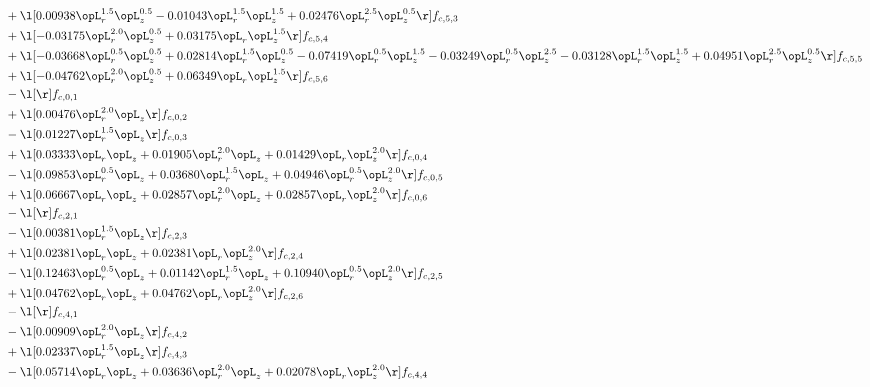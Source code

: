 \begin{alignat}{2}
& + \l[  0.00938 \opL_r^{1.5} \opL_z^{0.5}   -0.01043 \opL_r^{1.5} \opL_z^{1.5} +  0.02476 \opL_r^{2.5} \opL_z^{0.5}  \r] f_{c,5,3} \nonumber \\ 
& + \l[  -0.03175 \opL_r^{2.0} \opL_z^{0.5} +  0.03175 \opL_r \opL_z^{1.5}  \r] f_{c,5,4} \nonumber \\ 
& + \l[  -0.03668 \opL_r^{0.5} \opL_z^{0.5} +  0.02814 \opL_r^{1.5} \opL_z^{0.5}   -0.07419 \opL_r^{0.5} \opL_z^{1.5}   -0.03249 \opL_r^{0.5} \opL_z^{2.5}   -0.03128 \opL_r^{1.5} \opL_z^{1.5} +  0.04951 \opL_r^{2.5} \opL_z^{0.5}  \r] f_{c,5,5} \nonumber \\ 
& + \l[  -0.04762 \opL_r^{2.0} \opL_z^{0.5} +  0.06349 \opL_r \opL_z^{1.5}  \r] f_{c,5,6} \nonumber \\ 
& - \l[  \r] f_{c,0,1} \nonumber \\ 
& + \l[  0.00476 \opL_r^{2.0} \opL_z  \r] f_{c,0,2} \nonumber \\ 
& - \l[  0.01227 \opL_r^{1.5} \opL_z  \r] f_{c,0,3} \nonumber \\ 
& + \l[  0.03333 \opL_r \opL_z +  0.01905 \opL_r^{2.0} \opL_z +  0.01429 \opL_r \opL_z^{2.0}  \r] f_{c,0,4} \nonumber \\ 
& - \l[  0.09853 \opL_r^{0.5} \opL_z +  0.03680 \opL_r^{1.5} \opL_z +  0.04946 \opL_r^{0.5} \opL_z^{2.0}  \r] f_{c,0,5} \nonumber \\ 
& + \l[  0.06667 \opL_r \opL_z +  0.02857 \opL_r^{2.0} \opL_z +  0.02857 \opL_r \opL_z^{2.0}  \r] f_{c,0,6} \nonumber \\ 
& - \l[  \r] f_{c,2,1} \nonumber \\ 
& - \l[  0.00381 \opL_r^{1.5} \opL_z  \r] f_{c,2,3} \nonumber \\ 
& + \l[  0.02381 \opL_r \opL_z +  0.02381 \opL_r \opL_z^{2.0}  \r] f_{c,2,4} \nonumber \\ 
& - \l[  0.12463 \opL_r^{0.5} \opL_z +  0.01142 \opL_r^{1.5} \opL_z +  0.10940 \opL_r^{0.5} \opL_z^{2.0}  \r] f_{c,2,5} \nonumber \\ 
& + \l[  0.04762 \opL_r \opL_z +  0.04762 \opL_r \opL_z^{2.0}  \r] f_{c,2,6} \nonumber \\ 
& - \l[  \r] f_{c,4,1} \nonumber \\ 
& - \l[  0.00909 \opL_r^{2.0} \opL_z  \r] f_{c,4,2} \nonumber \\ 
& + \l[  0.02337 \opL_r^{1.5} \opL_z  \r] f_{c,4,3} \nonumber \\ 
& - \l[  0.05714 \opL_r \opL_z +  0.03636 \opL_r^{2.0} \opL_z +  0.02078 \opL_r \opL_z^{2.0}  \r] f_{c,4,4} \nonumber \\ 

\end{alignat}
